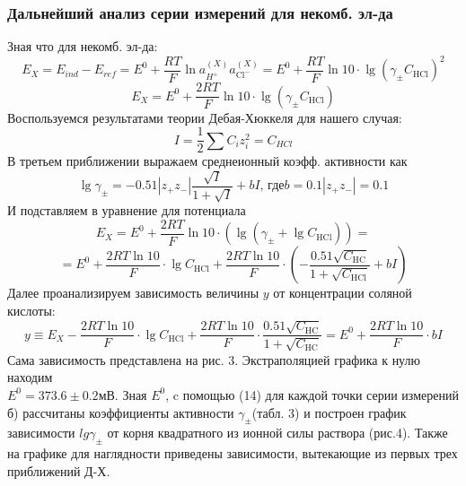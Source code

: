 \documentclass[a4paper, 12pt]{article}
\begin{document}
\subsubsection{Дальнейший анализ серии измерений для некомб. эл-да}
Зная что для некомб. эл-да:
\begin{equation}
E_{X}=E_{i n d}-E_{r e f}=E^{0}+\frac{R T}{F} \ln a_{H^{+}}^{(X)} a_{\mathrm{Cl}^{-}}^{(X)}=E^{0}+\frac{R T}{F} \ln 10 \cdot \lg \left(\gamma_{\pm} C_{\mathrm{HCl}}\right)^{2}
\end{equation}
\begin{equation}
E_{X}=E^{0}+\frac{2 R T}{F} \ln 10 \cdot \lg \left(\gamma_{\pm} C_{\mathrm{HCl}}\right)
\end{equation}
Воспользуемся результатами теории Дебая-Хюккеля для нашего случая:
\begin{equation}
I=\frac{1}{2} \sum C_{i} z^{2}_{i}=C_{H C l}
\end{equation}
В третьем приближении выражаем среднеионный коэфф. активности как
\begin{equation}
\lg \gamma_{\pm}=-0.51\left|z_{+} z_{-}\right| \frac{\sqrt{I}}{1+\sqrt{I}}+b I \text{, где} b=0.1\left|z_{+} z_{-}\right|=0.1
\end{equation}
И подставляем в уравнение для потенциала
\begin{displaymath}
E_{X}=E^{0}+\frac{2 R T}{F} \ln 10 \cdot (\lg \left(\gamma_{\pm} + \lg C_{\mathrm{HCl}}\right))=  
\end{displaymath}
\begin{displaymath}
=E^{0}+\frac{2 R T \ln 10}{F} \cdot \lg C_{\mathrm{HCl}}+\frac{2 R T \ln 10}{F} \cdot (-\frac{0.51 \sqrt{C_{\mathrm{HC}}}}{1+\sqrt{C_{\mathrm{HCl}}}} +bI)
\end{displaymath}
Далее проанализируем зависимость величины $y$ от концентрации соляной кислоты:
\begin{equation}
y  \equiv E_{X}-\frac{2 R T \ln 10}{F} \cdot \lg C_{\mathrm{HCl}}+\frac{2 R T \ln 10}{F} \cdot \frac{0.51 \sqrt{C_{\mathrm{HC}}}}{1+\sqrt{C_{\mathrm{HC}}}} = E^{0} + \frac{2 R T \ln 10}{F} \cdot bI
\end{equation}
Сама зависимость представлена на рис. 3. Экстраполяцией графика к нулю находим\\ $E^{0} = 373.6 \pm 0.2$мВ. Зная $E^{0}$, c помощью (14) для каждой точки серии измерений б) рассчитаны коэффициенты активности $\gamma_{\pm}$(табл. 3) и построен график зависимости $ lg \gamma_{\pm}$ от корня квадратного из ионной силы раствора (рис.4). Также на графике для наглядности приведены зависимости, вытекающие из первых трех приближений Д-Х.
\end{document}
